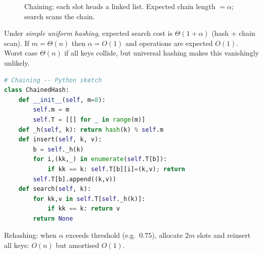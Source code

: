 \begin{figure}[h]
\centering
{}
\caption{Chaining: each slot heads a linked list. Expected chain length $=\alpha$; search scans the chain.}
\label{fig:chaining}
\end{figure}

Under \emph{simple uniform hashing}, expected search cost is $\Theta(1+\alpha)$ (hash + chain scan). If $m=\Theta(n)$ then $\alpha=O(1)$ and operations are expected $O(1)$. Worst case $\Theta(n)$ if all keys collide, but universal hashing makes this vanishingly unlikely.

\begin{lstlisting}[language=Python]
# Chaining -- Python sketch
class ChainedHash:
    def __init__(self, m=8):
        self.m = m
        self.T = [[] for _ in range(m)]
    def _h(self, k): return hash(k) % self.m
    def insert(self, k, v):
        b = self._h(k)
        for i,(kk,_) in enumerate(self.T[b]):
            if kk == k: self.T[b][i]=(k,v); return
        self.T[b].append((k,v))
    def search(self, k):
        for kk,v in self.T[self._h(k)]:
            if kk == k: return v
        return None
\end{lstlisting}

Rehashing: when $\alpha$ exceeds threshold (e.g.\ $0.75$), allocate $2m$ slots and reinsert all keys: $O(n)$ but amortised $O(1)$.

